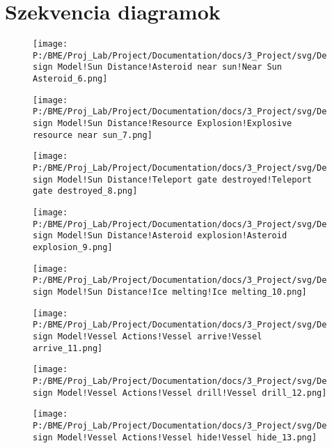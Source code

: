 \section{Szekvencia diagramok}
\begin{figure}[H] 
\centering 
\texttt{[image: P:/BME/Proj\_Lab/Project/Documentation/docs/3\_Project/svg/Design Model!Sun Distance!Asteroid near sun!Near Sun Asteroid\_6.png]} 
\end{figure} 

\begin{figure}[H] 
\centering 
\texttt{[image: P:/BME/Proj\_Lab/Project/Documentation/docs/3\_Project/svg/Design Model!Sun Distance!Resource Explosion!Explosive resource near sun\_7.png]} 
\caption{} 
\end{figure} 

\begin{figure}[H] 
\centering 
\texttt{[image: P:/BME/Proj\_Lab/Project/Documentation/docs/3\_Project/svg/Design Model!Sun Distance!Teleport gate destroyed!Teleport gate destroyed\_8.png]} 
\caption{} 
\end{figure} 

\begin{figure}[H] 
\centering 
\texttt{[image: P:/BME/Proj\_Lab/Project/Documentation/docs/3\_Project/svg/Design Model!Sun Distance!Asteroid explosion!Asteroid explosion\_9.png]} 
\caption{} 
\end{figure} 

\begin{figure}[H] 
\centering 
\texttt{[image: P:/BME/Proj\_Lab/Project/Documentation/docs/3\_Project/svg/Design Model!Sun Distance!Ice melting!Ice melting\_10.png]} 
\caption{} 
\end{figure} 

\begin{figure}[H] 
\centering 
\texttt{[image: P:/BME/Proj\_Lab/Project/Documentation/docs/3\_Project/svg/Design Model!Vessel Actions!Vessel arrive!Vessel arrive\_11.png]} 
\caption{} 
\end{figure} 

\begin{figure}[H] 
\centering 
\texttt{[image: P:/BME/Proj\_Lab/Project/Documentation/docs/3\_Project/svg/Design Model!Vessel Actions!Vessel drill!Vessel drill\_12.png]} 
\caption{} 
\end{figure} 

\begin{figure}[H] 
\centering 
\texttt{[image: P:/BME/Proj\_Lab/Project/Documentation/docs/3\_Project/svg/Design Model!Vessel Actions!Vessel hide!Vessel hide\_13.png]} 
\caption{} 
\end{figure} 

